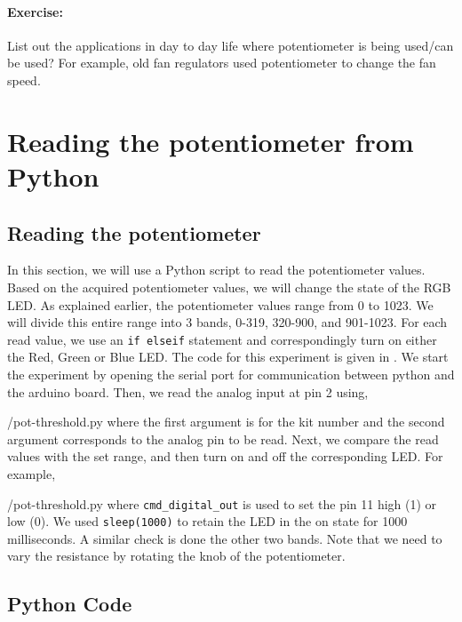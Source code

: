 \paragraph{Exercise:}
List out the applications in day to day life where potentiometer is
being used/can be used? For example, old fan regulators used
potentiometer to change the fan speed.

\section{Reading the potentiometer from Python}
\subsection{Reading the potentiometer}
In this section, we will use a Python script to read the potentiometer
values.  Based on the acquired potentiometer values, we will change
the state of the RGB LED. As explained earlier, the potentiometer
values range from 0 to 1023. We will divide this entire range into 3
bands, 0-319, 320-900, and 901-1023. For each read value, we use an
{\tt if elseif} statement and correspondingly turn on either the Red,
Green or Blue LED. The code for this experiment is given in
. We start the experiment by opening the serial port
for communication between python and the arduino board. Then, we read
the analog input at pin 2 using,

                {\LocPotpycode/pot-threshold.py} where the first
                argument is for
the kit number and the second argument corresponds to the analog pin to be read.  Next, we compare the read values with the set range, and then turn on and off the corresponding LED. For example, 

{\LocPotpycode/pot-threshold.py} where {\tt cmd\_digital\_out} is used to set the pin 11 high (1) or low (0). We used {\tt sleep(1000)} to retain the LED in the on state for 1000 milliseconds.  A similar check is done the other two bands. Note that we need to vary the resistance by rotating the knob of the potentiometer.

\subsection{Python Code}
\label{sec:pot-python-code}
\begin{pycode}
\label{py:pot-100}

\end{pycode}

